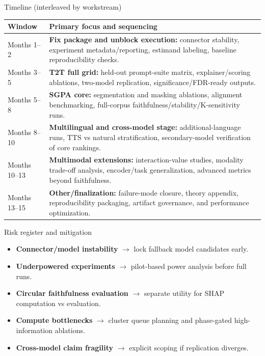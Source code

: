 \documentclass[aspectratio=169]{beamer}
\begin{document}
\begin{frame}{Timeline (interleaved by workstream)}
  \scriptsize
  \begin{tabularx}{\textwidth}{>{\raggedright\arraybackslash}p{2.2cm} >{\raggedright\arraybackslash}X}
    \toprule
    \textbf{Window} & \textbf{Primary focus and sequencing} \\
    \midrule
    Months 1--2 & \textbf{Fix package and unblock execution:} connector stability, experiment metadata/reporting, estimand labeling, baseline reproducibility checks. \\
    Months 3--5 & \textbf{T2T full grid:} held-out prompt-suite matrix, explainer/scoring ablations, two-model replication, significance/FDR-ready outputs. \\
    Months 5--8 & \textbf{SGPA core:} segmentation and masking ablations, alignment benchmarking, full-corpus faithfulness/stability/K-sensitivity runs. \\
    Months 8--10 & \textbf{Multilingual and cross-model stage:} additional-language runs, TTS vs natural stratification, secondary-model verification of core rankings. \\
    Months 10--13 & \textbf{Multimodal extensions:} interaction-value studies, modality trade-off analysis, encoder/task generalization, advanced metrics beyond faithfulness. \\
    Months 13--15 & \textbf{Other/finalization:} failure-mode closure, theory appendix, reproducibility packaging, artifact governance, and performance optimization. \\
    \bottomrule
  \end{tabularx}
\end{frame}

\begin{frame}{Risk register and mitigation}
  \begin{itemize}
    \item \textbf{Connector/model instability} \(\rightarrow\) lock fallback model candidates early.
    \item \textbf{Underpowered experiments} \(\rightarrow\) pilot-based power analysis before full runs.
    \item \textbf{Circular faithfulness evaluation} \(\rightarrow\) separate utility for SHAP computation vs evaluation.
    \item \textbf{Compute bottlenecks} \(\rightarrow\) cluster queue planning and phase-gated high-information ablations.
    \item \textbf{Cross-model claim fragility} \(\rightarrow\) explicit scoping if replication diverges.
  \end{itemize}
\end{frame}
\end{document}
